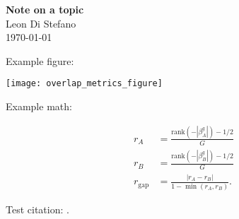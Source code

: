 \documentclass[11pt,fleqn]{article}
\begin{document}
\raggedright %

\textbf{Note on a topic} \\
Leon Di Stefano \\
\today

\vspace{0.1in}

\normalsize

Example figure:

\begin{center}\texttt{[image: overlap\_metrics\_figure]}\end{center}

Example math:

\begin{align*}
    r_A &= \frac{\mathrm{rank}(-|\beta_A^g|) - 1/2}{G} \\
    r_B &= \frac{\mathrm{rank}(-|\beta_B^g|) - 1/2}{G} \\
    r_\text{gap} &= \frac{|r_A - r_B|}{1 - \min(r_A, r_B)}.
\end{align*}

Test citation: \citep{rubinObjectiveCausalInference2008}.

\printbibliography
\end{document}
